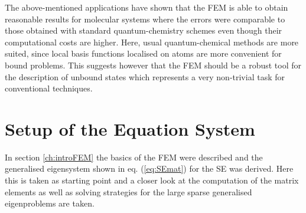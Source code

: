 The above-mentioned applications have shown that the FEM is able to obtain reasonable results for molecular systems where the errors were comparable to those obtained with standard quantum-chemistry schemes even though their computational costs are higher.
Here, usual quantum-chemical methods are more suited, since local basis functions localised on atoms are more convenient for bound problems.
This suggests however that the FEM should be a robust tool for the description of unbound states which represents a very non-trivial task for conventional techniques.

\section{Setup of the Equation System}
\label{ch:feInt}
In section \ref{ch:introFEM} the basics of the FEM were described and the generalised eigensystem shown in eq. (\ref{eq:SEmat}) for the SE was derived.
Here this is taken as starting point and a closer look at the computation of the matrix elements as well as solving strategies for the large sparse generalised eigenproblems are taken.

